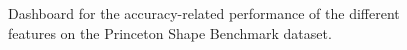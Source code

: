 \begin{figure}[h]
  \caption{Dashboard for the accuracy-related performance of the different features on the Princeton Shape Benchmark dataset.}
  \label{fig:PSB_dashboard}
\end{figure}

